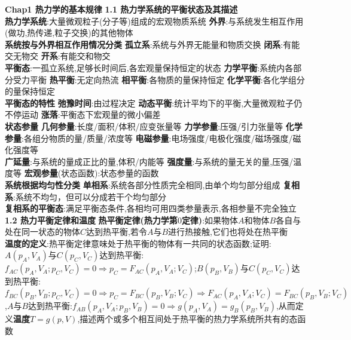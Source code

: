 \documentclass[10pt,a4paper]{article}
\begin{document}
\tiny
\begin{multicols}{2}
\noindent\textbf{Chap1 热力学的基本规律}
\textbf{1.1 热力学系统的平衡状态及其描述}\\
\textbf{热力学系统}:大量微观粒子(分子等)组成的宏观物质系统\quad
\textbf{外界}:与系统发生相互作用(做功,热传递,粒子交换)的其他物体\\
\textbf{系统按与外界相互作用情况分类}\quad
\textbf{孤立系}:系统与外界无能量和物质交换\quad
\textbf{闭系}:有能交无物交\quad
\textbf{开系}:有能交和物交\\
\textbf{平衡态}:一孤立系统,足够长时间后,各宏观量保持恒定的状态\quad
\textbf{力学平衡}:系统内各部分受力平衡\quad
\textbf{热平衡}:无定向热流\quad
\textbf{相平衡}:各物质的量保持恒定
\textbf{化学平衡}:各化学组分的量保持恒定\\
\textbf{平衡态的特性}\quad
\textbf{弛豫时间}:由过程决定\quad
\textbf{动态平衡}:统计平均下的平衡,大量微观粒子仍不停运动\quad
\textbf{涨落}:平衡态下宏观量的微小偏差\\
\textbf{状态参量}\quad
\textbf{几何参量}:长度/面积/体积/应变张量等\quad
\textbf{力学参量}:压强/引力张量等\quad
\textbf{化学参量}:各组分物质的量/质量/浓度等\quad
\textbf{电磁参量}:电场强度/电极化强度/磁场强度/磁化强度等\\
\textbf{广延量}:与系统的量成正比的量,体积/内能等\quad
\textbf{强度量}:与系统的量无关的量,压强/温度等\quad
\textbf{宏观参量}(状态函数):状态参量的函数\\
\textbf{系统根据均匀性分类}\quad
\textbf{单相系}:系统各部分性质完全相同,由单个均匀部分组成\quad
\textbf{复相系}:系统不均匀，但可以分成若干个均匀部分\\
\textbf{复相系的平衡态}:满足平衡态条件,各相均可用四类参量表示,各相参量不完全独立\\
\textbf{1.2 热力平衡定律和温度}
\textbf{热平衡定律(热力学第$0$定律)}:如果物体$A$和物体$B$各自与处在同一状态的物体$C$达到热平衡,若令$A$与$B$进行热接触,它们也将处在热平衡\\
\textbf{温度的定义}:热平衡定律意味处于热平衡的物体有一共同的状态函数;证明:$A(p_A,V_A)$与$C(p_C,V_C)$达到热平衡:$f_{AC}(p_A,V_A;p_C,V_C)=0\Rightarrow p_C=F_{AC}(p_A,V_A;V_C)$;$B(p_B,V_B)$与$C(p_C,V_C)$达到热平衡:$f_{BC}(p_B,V_B;p_C,V_C)=0\Rightarrow p_C=F_{BC}(p_B,V_B;V_C)\Rightarrow F_{AC}(p_A,V_A;V_C)=F_{BC}(p_B,V_B;V_C)$,$A$与$B$达到热平衡:$f_{AB}(p_A,V_A;p_B,V_B)=0\Rightarrow g(p_A,V_A)=g_B(p_B,V_B)$,从而定义\textbf{温度}$T=g(p,V)$,描述两个或多个相互间处于热平衡的热力学系统所共有的态函数\\

\end{multicols}
\end{document}
